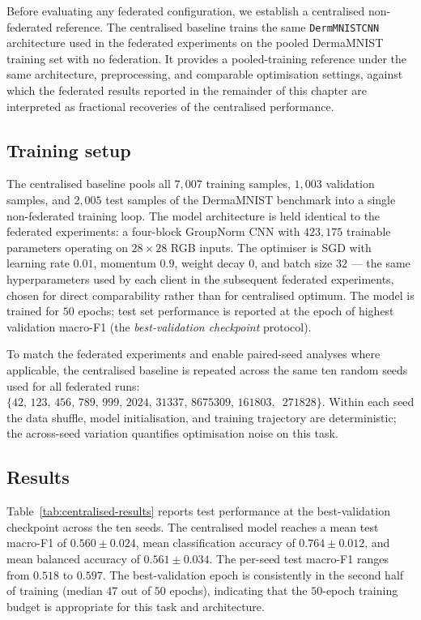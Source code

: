 \documentclass[11pt,a4paper]{report}
\begin{document}
Before evaluating any federated configuration, we establish a
centralised non-federated reference. The centralised baseline trains
the same \texttt{DermMNISTCNN} architecture used in the federated
experiments on the pooled DermaMNIST training set with no
federation. It provides a pooled-training reference under the
same architecture, preprocessing, and comparable optimisation
settings, against which the federated results reported in the
remainder of this chapter are interpreted as fractional
recoveries of the centralised performance.

\subsection{Training setup}
\label{sec:centralised-setup}

The centralised baseline pools all $7{,}007$ training samples,
$1{,}003$ validation samples, and $2{,}005$ test samples of the
DermaMNIST benchmark into a single non-federated training loop.
The model architecture is held identical to the federated
experiments: a four-block GroupNorm CNN with $423{,}175$ trainable
parameters operating on $28\times28$ RGB inputs. The optimiser is
SGD with learning rate $0.01$, momentum $0.9$, weight decay $0$,
and batch size $32$ --- the same hyperparameters used by each
client in the subsequent federated experiments, chosen for direct
comparability rather than for centralised optimum. The model is
trained for $50$ epochs; test set performance is reported at the
epoch of highest validation macro-F1 (the
\emph{best-validation checkpoint} protocol).

To match the federated experiments and enable paired-seed analyses
where applicable, the centralised baseline is repeated across the
same ten random seeds used for all federated runs:
$\{42,\,123,\,456,\,789,\,999,\,2024,\,31337,\,8675309,\,161803,\,$
$271828\}$. Within each seed the data shuffle, model
initialisation, and training trajectory are deterministic; the
across-seed variation quantifies optimisation noise on this task.

\subsection{Results}
\label{sec:centralised-results}

Table~\ref{tab:centralised-results} reports test performance at
the best-validation checkpoint across the ten seeds. The
centralised model reaches a mean test macro-F1 of
$0.560\pm0.024$, mean classification accuracy of
$0.764\pm0.012$, and mean balanced accuracy of
$0.561\pm0.034$. The per-seed test macro-F1 ranges from
$0.518$ to $0.597$. The best-validation epoch is consistently in
the second half of training (median $47$ out of $50$ epochs),
indicating that the $50$-epoch training budget is appropriate
for this task and architecture.
\end{document}
